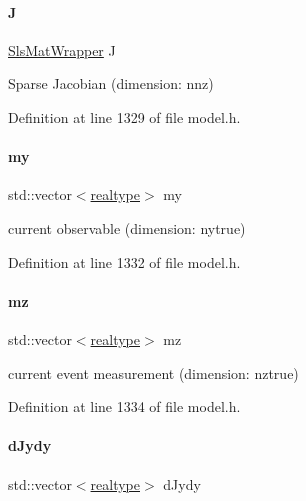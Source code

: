 \paragraph{\texorpdfstring{J}{J}}
{\footnotesize\ttfamily \mbox{\hyperlink{classamici_1_1_sls_mat_wrapper}{Sls\+Mat\+Wrapper}} J\hspace{0.3cm}{\ttfamily [protected]}}

Sparse Jacobian (dimension\+: nnz) 

Definition at line 1329 of file model.\+h.

\mbox{\label{classamici_1_1_model_ab9db87a0acf848c904c792edab3b5828}} 
\paragraph{\texorpdfstring{my}{my}}
{\footnotesize\ttfamily std\+::vector$<$\mbox{\hyperlink{namespaceamici_a1bdce28051d6a53868f7ccbf5f2c14a3}{realtype}}$>$ my\hspace{0.3cm}{\ttfamily [protected]}}

current observable (dimension\+: nytrue) 

Definition at line 1332 of file model.\+h.

\mbox{\label{classamici_1_1_model_afff14791b6839ad61750cc360e44e890}} 
\paragraph{\texorpdfstring{mz}{mz}}
{\footnotesize\ttfamily std\+::vector$<$\mbox{\hyperlink{namespaceamici_a1bdce28051d6a53868f7ccbf5f2c14a3}{realtype}}$>$ mz\hspace{0.3cm}{\ttfamily [protected]}}

current event measurement (dimension\+: nztrue) 

Definition at line 1334 of file model.\+h.

\mbox{\label{classamici_1_1_model_a3ac4a9286766476c57fba8edbb2da345}} 
\paragraph{\texorpdfstring{dJydy}{dJydy}}
{\footnotesize\ttfamily std\+::vector$<$\mbox{\hyperlink{namespaceamici_a1bdce28051d6a53868f7ccbf5f2c14a3}{realtype}}$>$ d\+Jydy\hspace{0.3cm}{\ttfamily [protected]}}

